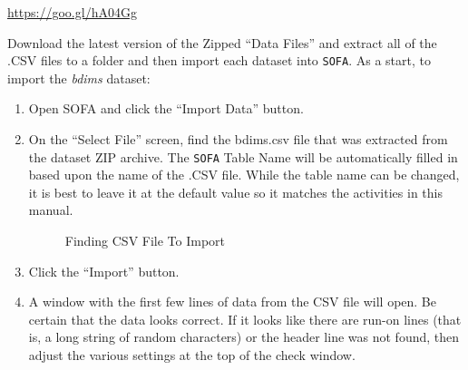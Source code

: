 \url{https://goo.gl/hA04Gg}

Download the latest version of the Zipped ``Data Files'' and extract all of the .CSV files to a folder and then import each dataset into \texttt{SOFA}. As a start, to import the \textit{bdims} dataset:

\begin{enumerate}
  \item Open SOFA and click the ``Import Data'' button.
  \item On the ``Select File'' screen, find the bdims.csv file that was extracted from the dataset ZIP archive. The \texttt{SOFA} Table Name will be automatically filled in based upon the name of the .CSV file. While the table name can be changed, it is best to leave it at the default value so it matches the activities in this manual.
  
  \begin{figure}[H]
    \begin{center}
      \caption{Finding CSV File To Import}
    \end{center}
  \end{figure}
  
  \item Click the ``Import'' button.
  \item A window with the first few lines of data from the CSV file will open. Be certain that the data looks correct. If it looks like there are run-on lines (that is, a long string of random characters) or the header line was not found, then adjust the various settings at the top of the check window.
  

\end{enumerate}
